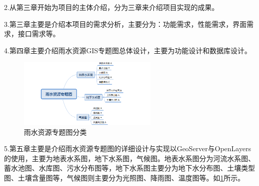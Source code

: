 2.从第三章开始为项目的主体介绍，分为三章来介绍项目实现的成果。

3.第三章主要是介绍本项目的需求分析，主要分为：功能需求，性能需求，界面需求，接口需求等。

4.第四章主要介绍雨水资源GIS专题图总体设计，主要为功能设计和数据库设计。

\begin{figure}[H]%
	\centering
	\includegraphics[width=0.60\textwidth]{figs/tree_1.png}
	\caption{雨水资源专题图分类}
	\label{fig:classify_rain}
\end{figure}

5.第五章主要是介绍雨水资源专题图的详细设计与实现以GeoServer与OpenLayers的使用，主要为地表水系图，地下水系图，气候图。地表水系图分为河流水系图、蓄水池图、水库图、污水分布图等，地下水系图主要分为地下水分布图、土壤类型图、土壤含量图等，气候图则主要分为光照图、降雨图、温度图等。如\ref{fig:classify_rain}所示。


%

%

%
%





